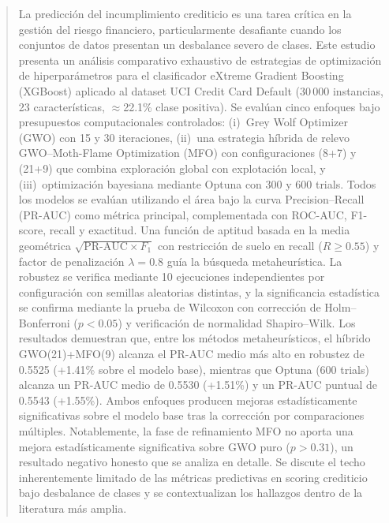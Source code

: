 \documentclass[journal]{IEEEtran}
\begin{document}
\maketitle
\IEEEpeerreviewmaketitle

\renewcommand{\abstractname}{Resumen}
\renewcommand{\IEEEkeywordsname}{Palabras clave}

\begin{abstract}
La predicción del incumplimiento crediticio es una tarea crítica en la gestión del riesgo financiero, particularmente desafiante cuando los conjuntos de datos presentan un desbalance severo de clases. Este estudio presenta un análisis comparativo exhaustivo de estrategias de optimización de hiperparámetros para el clasificador eXtreme Gradient Boosting (XGBoost) aplicado al dataset UCI Credit Card Default (30\,000 instancias, 23 características, ${\approx}$22.1\% clase positiva). Se evalúan cinco enfoques bajo presupuestos computacionales controlados: (i)~Grey Wolf Optimizer (GWO) con 15 y 30 iteraciones, (ii)~una estrategia híbrida de relevo GWO--Moth-Flame Optimization (MFO) con configuraciones (8+7) y (21+9) que combina exploración global con explotación local, y (iii)~optimización bayesiana mediante Optuna con 300 y 600 trials. Todos los modelos se evalúan utilizando el área bajo la curva Precision--Recall (PR-AUC) como métrica principal, complementada con ROC-AUC, F1-score, recall y exactitud. Una función de aptitud basada en la media geométrica $\sqrt{\text{PR-AUC} \times F_1}$ con restricción de suelo en recall ($R \geq 0.55$) y factor de penalización $\lambda = 0.8$ guía la búsqueda metaheurística. La robustez se verifica mediante 10 ejecuciones independientes por configuración con semillas aleatorias distintas, y la significancia estadística se confirma mediante la prueba de Wilcoxon con corrección de Holm--Bonferroni ($p < 0.05$) y verificación de normalidad Shapiro--Wilk. Los resultados demuestran que, entre los métodos metaheurísticos, el híbrido GWO(21)+MFO(9) alcanza el PR-AUC medio más alto en robustez de 0.5525 (+1.41\% sobre el modelo base), mientras que Optuna (600 trials) alcanza un PR-AUC medio de 0.5530 (+1.51\%) y un PR-AUC puntual de 0.5543 (+1.55\%). Ambos enfoques producen mejoras estadísticamente significativas sobre el modelo base tras la corrección por comparaciones múltiples. Notablemente, la fase de refinamiento MFO no aporta una mejora estadísticamente significativa sobre GWO puro ($p > 0.31$), un resultado negativo honesto que se analiza en detalle. Se discute el techo inherentemente limitado de las métricas predictivas en scoring crediticio bajo desbalance de clases y se contextualizan los hallazgos dentro de la literatura más amplia.
\end{abstract}
\end{document}
